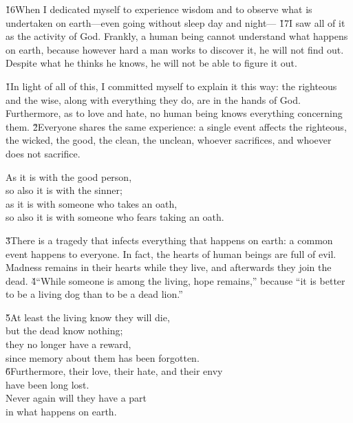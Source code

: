\v{16}When I dedicated myself to experience wisdom and to observe what is undertaken on earth---even going without sleep day and night--- \v{17}I saw all of it as the activity of God. Frankly, a human being cannot understand what happens on earth, because however hard a man works to discover it, he will not find out. Despite what he thinks he knows, he will not be able to figure it out.

\v{1}In light of all of this, I committed myself to explain it this way: the righteous and the wise, along with everything they do, are in the hands of God. Furthermore, as to love and hate, no human being knows everything concerning them. \v{2}Everyone shares the same experience: a single event affects the righteous, the wicked, the good, the clean, the unclean, whoever sacrifices, and whoever does not sacrifice.

\begin{poetry}
\poeml As it is with the good person, \\
\poemll    so also it is with the sinner; \\
\poeml as it is with someone who takes an oath, \\
\poemll    so also it is with someone who fears taking an oath.
\end{poetry}

\v{3}There is a tragedy that infects everything that happens on earth: a common event happens to everyone. In fact, the hearts of human beings are full of evil. Madness remains in their hearts while they live, and afterwards they join the dead. \v{4}``While someone is among the living, hope remains,'' because ``it is better to be a living dog than to be a dead lion.''

\begin{poetry}
\poeml \v{5}At least the living know they will die, \\
\poemll    but the dead know nothing; \\
\poeml they no longer have a reward, \\
\poemll    since memory about them has been forgotten. \\
\poeml \v{6}Furthermore, their love, their hate, and their envy \\
\poemll    have been long lost. \\
\poeml Never again will they have a part \\
\poemll    in what happens on earth.
\end{poetry}

